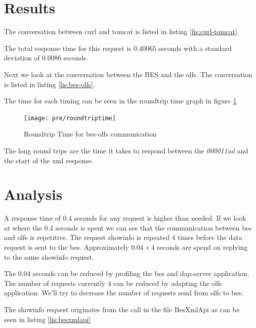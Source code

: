 \documentclass{article}
\begin{document}
\section{Results}
The conversation between curl and tomcat is listed in listing \ref{lis:curl-tomcat}.

The total response time for this request is $0.40065$ seconds with a standard deviation of $0.0086$ seconds. 

Next we look at the conversation between the BES and the olfs. The conversation is listed in listing \ref{lis:bes-olfs}.

The time for each timing can be seen in the roundtrip time graph in figure \ref{fig:roundtrip}
\begin{figure}
\centering
\texttt{[image: pre/roundtriptime]}
\caption{Roundtrip Time for bes-olfs communication}\label{fig:roundtrip}
\end{figure}
The long round trips are the time it takes to respond between the \textit{000011ad} and the start of the xml response. 

\section{Analysis}
A response time of $0.4$ seconds for any request is higher than needed. If we look at where the $0.4$ seconds is spent we can see that the communication between bes and olfs is repetitive. The request showinfo is repeated 4 times before the data request is sent to the bes. Approximately $0.04 \times 4$ seconds are spend on replying to the same showinfo request. 

The $0.04$ seconds can be reduced by profiling the bes and dap-server application. The number of requests currently 4 can be reduced by adapting the olfs application. We'll try to decrease the number of requests send from olfs to bes. 

The showinfo request originates from the call in the file BesXmlApi as can be seen in listing \ref{lis:besxmlapi}

\end{document}

